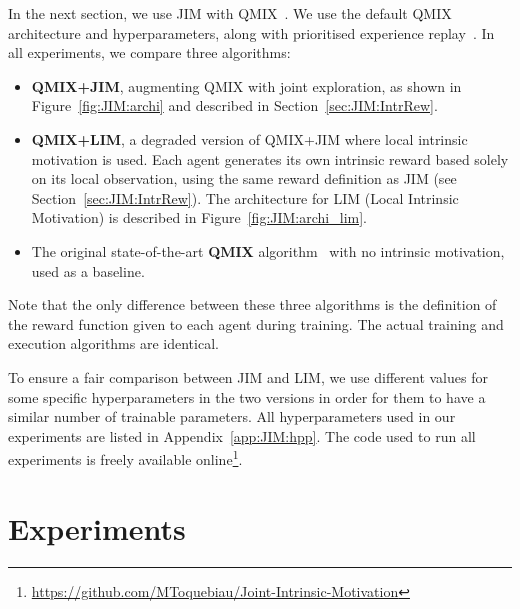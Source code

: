In the next section, we use JIM with QMIX~\citep{Rashid2018_QMIX}. We use the default QMIX architecture and hyperparameters, along with prioritised experience replay~\citep{Schaul2016_PER}. In all experiments, we compare three algorithms: 
\begin{itemize}
    \item \textbf{QMIX+JIM}, augmenting QMIX with joint exploration, as shown in Figure~\ref{fig:JIM:archi} and described in Section~\ref{sec:JIM:IntrRew}.
    \item \textbf{QMIX+LIM}, a degraded version of QMIX+JIM where local intrinsic motivation is used. Each agent generates its own intrinsic reward based solely on its local observation, using the same reward definition as JIM (see Section~\ref{sec:JIM:IntrRew}). The architecture for LIM (Local Intrinsic Motivation) is described in Figure~\ref{fig:JIM:archi_lim}.
    \item The original state-of-the-art \textbf{QMIX} algorithm~\citep{Rashid2018_QMIX} with no intrinsic motivation, used as a baseline. 
\end{itemize}
Note that the only difference between these three algorithms is the definition of the reward function given to each agent during training. The actual training and execution algorithms are identical. 

To ensure a fair comparison between JIM and LIM, we use different values for some specific hyperparameters in the two versions in order for them to have a similar number of trainable parameters. All hyperparameters used in our experiments are listed in Appendix~\ref{app:JIM:hpp}. The code used to run all experiments is freely available online\footnote{\url{https://github.com/MToquebiau/Joint-Intrinsic-Motivation}}.








\section{Experiments}

